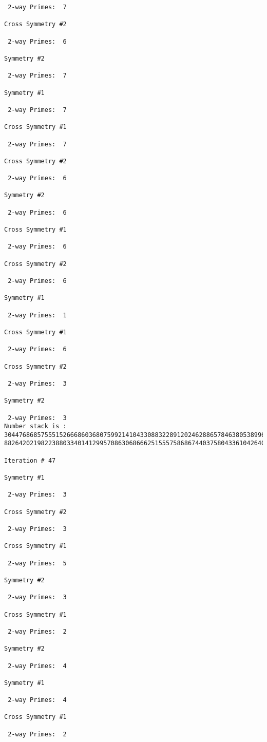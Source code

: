 \begin{verbatim}
 2-way Primes: 	7

Cross Symmetry #2

 2-way Primes: 	6

Symmetry #2

 2-way Primes: 	7

Symmetry #1

 2-way Primes: 	7

Cross Symmetry #1

 2-way Primes: 	7

Cross Symmetry #2

 2-way Primes: 	6

Symmetry #2

 2-way Primes: 	6

Cross Symmetry #1

 2-way Primes: 	6

Cross Symmetry #2

 2-way Primes: 	6

Symmetry #1

 2-way Primes: 	1

Cross Symmetry #1

 2-way Primes: 	6

Cross Symmetry #2

 2-way Primes: 	3

Symmetry #2

 2-way Primes: 	3
Number stack is :
30447686857555152666860368075992141043308832289120246288657846380538996794608835958544046240163340857
88264202198223880334014129957086306866625155575868674403758043361042640445859538806497699835083648756

Iteration #	47

Symmetry #1

 2-way Primes: 	3

Cross Symmetry #2

 2-way Primes: 	3

Cross Symmetry #1

 2-way Primes: 	5

Symmetry #2

 2-way Primes: 	3

Cross Symmetry #1

 2-way Primes: 	2

Symmetry #2

 2-way Primes: 	4

Symmetry #1

 2-way Primes: 	4

Cross Symmetry #1

 2-way Primes: 	2


\end{verbatim}
